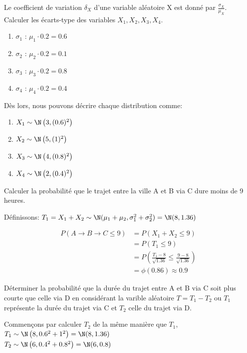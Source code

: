 \begin{exo}
\begin{subexo}{Le coefficient de variation $\delta_X$ d'une variable aléatoire X est donné par $\frac{\sigma_X}{\mu_X}$. Calculer les écarts-type des variables $X_1,X_2,X_3,X_4$.}
\begin{center}
			  \begin{enumerate}
				\item $\sigma_1$ : $\mu_1 \cdot 0.2 = 0.6$ 
				\item $\sigma_2$ : $\mu_2 \cdot 0.2 = 0.1$ 
				\item $\sigma_3$ : $\mu_3 \cdot 0.2 = 0.8$ 
				\item $\sigma_4$ : $\mu_4 \cdot 0.2 = 0.4$ 
			\end{enumerate}
		Dès lors, nous pouvons décrire chaque distribution comme:
		  \begin{enumerate}
			\item $X_1 \sim \N\left(3, (0.6)^2\right)$
			\item $X_2 \sim \N\left(5, (1)^2\right)$
			\item $X_3 \sim \N\left(4, (0.8)^2\right)$
			\item $X_4 \sim \N\left(2, (0.4)^2\right)$
		\end{enumerate}
		\end{center}
	\end{subexo}	
	\begin{subexo}{Calculer la probabilité que le trajet entre la ville A et B via C dure moins de 9 heures.}
		\begin{center}
			Définissons: $T_1 = X_1 + X_2 \sim \N(\mu_1 + \mu_2, \sigma_1^2 + \sigma_2^2) = \N(8,1.36)$
		\end{center}
		\begin{align*}
			P(A \rightarrow B \rightarrow C \leq 9) &= P(X_1 + X_2 \leq 9) \\
			&= P(T_1 \leq 9) \\
			&= P\left(\frac{T_1-8}{\sqrt{1.36}} \leq \frac{9-8}{\sqrt{1.36}}\right) \\
			&= \phi(0.86) \approx 0.9
		\end{align*}
	\end{subexo}
	\begin{subexo}{Déterminer la probabilité que la durée du trajet entre A et B via C soit plus courte que celle via D en considérant la varible aléatoire $T = T_1 - T_2$ ou $T_1$ représente la durée du trajet via C et $T_2$ celle du trajet via D.}
	\end{subexo}
	\begin{center}
		Commençons par calculer $T_2$ de la même manière que $T_1$, \\
		$T_1 \sim \N\left(8,0.6^2 + 1^2\right) = \N(8,1.36)$ \\
		$T_2 \sim \N\left(6,0.4^2 + 0.8^2\right) = \N(6,0.8)$ \\

\end{center}
\end{exo}
